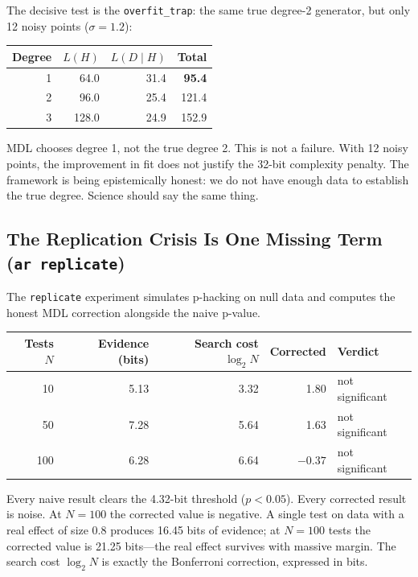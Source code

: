 The decisive test is the \texttt{overfit\_trap}: the same true degree-2
generator, but only 12 noisy points ($\sigma = 1.2$):

\begin{center}
\begin{tabular}{rrrr}
\toprule
Degree & $L(H)$ & $L(D \mid H)$ & Total \\
\midrule
1 & 64.0 & 31.4 & \textbf{95.4} \\
2 & 96.0 & 25.4 & 121.4 \\
3 & 128.0 & 24.9 & 152.9 \\
\bottomrule
\end{tabular}
\end{center}

MDL chooses degree 1, not the true degree 2. This is not a failure.
With 12 noisy points, the improvement in fit does not justify the
32-bit complexity penalty. The framework is being epistemically honest:
we do not have enough data to establish the true degree. Science should
say the same thing.

\subsection{The Replication Crisis Is One Missing Term (\texttt{ar replicate})}

The \texttt{replicate} experiment simulates p-hacking on null data and
computes the honest MDL correction alongside the naive p-value.

\begin{center}
\begin{tabular}{rrrrl}
\toprule
Tests $N$ & Evidence (bits) & Search cost $\log_2 N$ & Corrected & Verdict \\
\midrule
10  & 5.13 & 3.32 & 1.80  & not significant \\
50  & 7.28 & 5.64 & 1.63  & not significant \\
100 & 6.28 & 6.64 & $-0.37$ & not significant \\
\bottomrule
\end{tabular}
\end{center}

Every naive result clears the 4.32-bit threshold ($p < 0.05$). Every
corrected result is noise. At $N = 100$ the corrected value is negative.
A single test on data with a real effect of size 0.8 produces 16.45 bits
of evidence; at $N = 100$ tests the corrected value is 21.25 bits---the
real effect survives with massive margin. The search cost $\log_2 N$ is
exactly the Bonferroni correction, expressed in bits.

